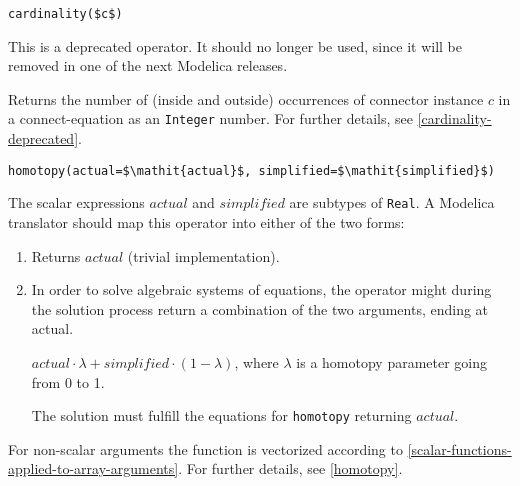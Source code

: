 \begin{operatordefinition}[cardinality]
\begin{synopsis}\begin{lstlisting}
cardinality($c$)
\end{lstlisting}\end{synopsis}
\begin{semantics}
\begin{nonnormative}
This is a deprecated operator.  It should no longer be used, since it will be removed in one of the next Modelica releases.
\end{nonnormative}
Returns the number of (inside and outside) occurrences of connector instance $c$ in a connect-equation as an \lstinline!Integer! number.  For further details, see \cref{cardinality-deprecated}.
\end{semantics}
\end{operatordefinition}

\begin{operatordefinition}[homotopy]
\begin{synopsis}\begin{lstlisting}
homotopy(actual=$\mathit{actual}$, simplified=$\mathit{simplified}$)
\end{lstlisting}\end{synopsis}
\begin{semantics}
The scalar expressions $\mathit{actual}$ and $\mathit{simplified}$ are subtypes of \lstinline!Real!.  A Modelica translator should map this operator into either of the two forms:
\begin{enumerate}
\item
  Returns $\mathit{actual}$ (trivial implementation).
\item
  In order to solve algebraic systems of equations, the operator might during the solution process return a combination of the two arguments, ending at actual.
  \begin{example}
  $\mathit{actual} \cdot \lambda + \mathit{simplified} \cdot (1 - \lambda)$, where $\lambda$ is a homotopy parameter going from 0 to 1.
  \end{example}
  The solution must fulfill the equations for \lstinline!homotopy! returning $\mathit{actual}$.
\end{enumerate}
For non-scalar arguments the function is vectorized according to \cref{scalar-functions-applied-to-array-arguments}.  For further details, see \cref{homotopy}.
\end{semantics}
\end{operatordefinition}

